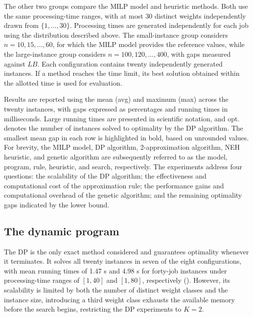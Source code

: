 \documentclass[12pt]{article}
\begin{document}
\begin{sloppypar}
        The other two groups compare the MILP model and heuristic methods.
        Both use the same processing-time ranges, with at most 30 distinct
        weights independently drawn from \(\{1,\ldots,30\}\). Processing times
        are generated independently for each job using the distribution
        described above. The small-instance group considers
        \(n=10,15,\ldots,60\), for which the MILP model provides the reference
        values, while the large-instance group considers
        \(n=100,120,\ldots,400\), with gaps measured against \(LB\).
        Each configuration contains twenty independently generated instances.
        If a method reaches the time limit, its best solution obtained within
        the allotted time is used for evaluation.
        
        Results are reported using the mean (avg) and maximum (max) across
        the twenty instances, with gaps expressed as percentages and running
        times in milliseconds. Large running times are presented in scientific
        notation, and opt. denotes the number of instances solved to optimality
        by the DP algorithm. The smallest mean gap in each row is highlighted
        in bold, based on unrounded values. For brevity, the MILP model, DP
        algorithm, 2-approximation algorithm, NEH heuristic, and genetic
        algorithm are subsequently referred to as the model, program, rule,
        heuristic, and search, respectively. The experiments address four
        questions: the scalability of the DP algorithm; the effectiveness and
        computational cost of the approximation rule; the performance gains
        and computational overhead of the genetic algorithm; and the remaining
        optimality gaps indicated by the lower bound.
        
        \subsection{The dynamic program}
        
        The DP is the only exact method considered and guarantees optimality whenever it terminates. 
        It solves all twenty instances in seven of the eight configurations, 
        with mean running times of 1.47 s and 4.98 s for forty-job instances under processing-time 
        ranges of \([1,40]\) and \([1,80]\), respectively (). 
        However, its scalability is limited by both the number of distinct weight classes and the instance size, 
        introducing a third weight class exhausts the available memory before the search begins, 
        restricting the DP experiments to \(K=2\).
        

\end{sloppypar}
\end{document}
